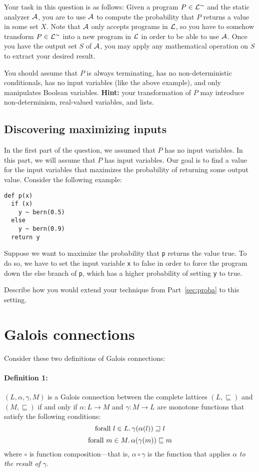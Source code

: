 \documentclass[11pt, oneside]{article}   	%
\begin{document}
Your task in this question is as follows:
Given a program $P \in \mathcal{L}^\sim$ and the static
analyzer $\mathcal{A}$, you are to use $\mathcal{A}$
to compute the probability that $P$ returns
a value in some set $X$.
Note that $\mathcal{A}$ only accepts programs in $\mathcal{L}$,
so you have to somehow transform $P \in \mathcal{L}^\sim$ into a new
program in $\mathcal{L}$
in order to be able to use $\mathcal{A}$.
Once you have the output set $S$ of $\mathcal{A}$,
you may apply any mathematical  operation on $S$ to
extract your desired result.

You should assume that $P$ is always terminating,
has no non-deterministic conditionals,
has no input variables (like the above example),
and only manipulates Boolean variables.
\textbf{Hint:} your transformation of $P$
may introduce non-determinism, real-valued variables,
and lists.

\subsection{Discovering maximizing inputs}
In the first part of the question,
we assumed that $P$ has no input variables.
In this part, we will assume that $P$ has input variables.
Our goal is to find a value for the input variables
that maximizes the probability of returning some output value.
Consider the following example:
\begin{verbatim}
def p(x)
  if (x)
    y ~ bern(0.5)
  else
    y ~ bern(0.9)
  return y
\end{verbatim}
Suppose we want to maximize the probability
that \texttt{p} returns the value true.
To do so, we have to set the input variable \texttt{x}
to false in order to force the program down the
else branch of \texttt{p}, which has a higher
probability of setting \texttt{y} to true.

Describe how you would extend your
technique from Part~\ref{sec:proba} to this setting.

\section{Galois connections}
Consider these two definitions of Galois connections:

\paragraph{Definition 1:}
$(L,\alpha,\gamma,M)$ is a Galois connection
between the complete lattices $(L,\sqsubseteq)$
and $(M,\sqsubseteq)$ if and only if
$\alpha:L \rightarrow M$ and $\gamma:M \rightarrow L$
are monotone functions that satisfy the following conditions:
$$\textrm{forall } l \in L \ldotp \gamma(\alpha(l)) \sqsupseteq l$$
$$\textrm{forall } m \in M \ldotp \alpha(\gamma(m)) \sqsubseteq m$$
where $\circ$ is function composition---that is,
$\alpha \circ \gamma$ is the function that applies
$\alpha$ \emph{to the result of} $\gamma$.
\end{document}
